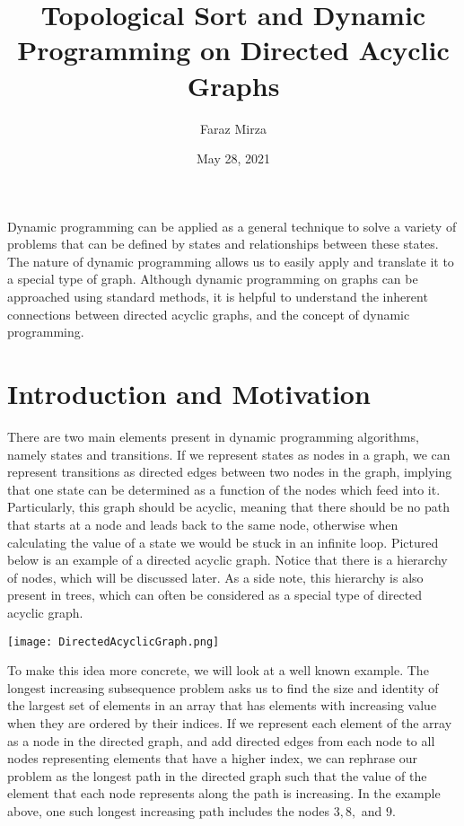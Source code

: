 \documentclass{article}
\title{Topological Sort and Dynamic Programming on Directed Acyclic Graphs}
\author{Faraz Mirza}
\date{May 28, 2021}
\begin{document}
\maketitle
Dynamic programming can be applied as a general technique to solve a variety of problems that can be defined by states and relationships between these states. The nature of dynamic programming allows us to easily apply and translate it to a special type of graph. Although dynamic programming on graphs can be approached using standard methods, it is helpful to understand the inherent connections between directed acyclic graphs, and the concept of dynamic programming.
\section{Introduction and Motivation}
There are two main elements present in dynamic programming algorithms, namely states and transitions. If we represent states as nodes in a graph, we can represent transitions as directed edges between two nodes in the graph, implying that one state can be determined as a function of the nodes which feed into it.
\\
\hfill\break
Particularly, this graph should be acyclic, meaning that there should be no path that starts at a node and leads back to the same node, otherwise when calculating the value of a state we would be stuck in an infinite loop. Pictured below is an example of a directed acyclic graph. Notice that there is a hierarchy of nodes, which will be discussed later. As a side note, this hierarchy is also present in trees, which can often be considered as a special type of directed acyclic graph.
\begin{center}
  \texttt{[image: DirectedAcyclicGraph.png]}
\end{center}
To make this idea more concrete, we will look at a well known example. The longest increasing subsequence problem asks us to find the size and identity of the largest set of elements in an array that has elements with increasing value when they are ordered by their indices. If we represent each element of the array as a node in the directed graph, and add directed edges from each node to all nodes representing elements that have a higher index, we can rephrase our problem as the longest path in the directed graph such that the value of the element that each node represents along the path is increasing. In the example above, one such longest increasing path includes the nodes $3, 8,$ and $9$.
\\
\end{document}
